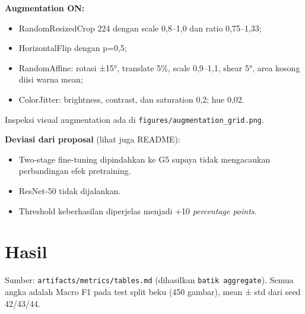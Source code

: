 \documentclass[10pt,a4paper]{article}
\providecommand{\tightlist}{\setlength{\itemsep}{2pt}\setlength{\parskip}{0pt}}
\begin{document}
\textbf{Augmentation ON:}

\begin{itemize}
\tightlist
\item
  RandomResizedCrop 224 dengan scale 0,8--1,0 dan ratio 0,75--1,33;
\item
  HorizontalFlip dengan p=0,5;
\item
  RandomAffine: rotasi ±15°, translate 5\%, scale 0,9--1,1, shear 5°, area kosong
  diisi warna mean;
\item
  ColorJitter: brightness, contrast, dan saturation 0,2; hue 0,02.
\end{itemize}

Inspeksi visual augmentation ada di \texttt{figures/\allowbreak{}augmentation\_\allowbreak{}grid.png}.

\textbf{Deviasi dari proposal} (lihat juga README):

\begin{itemize}
\tightlist
\item
  Two-stage fine-tuning dipindahkan ke G5 supaya tidak mengacaukan perbandingan
  efek pretraining.
\item
  ResNet-50 tidak dijalankan.
\item
  Threshold keberhasilan diperjelas menjadi +10 \emph{percentage points}.
\end{itemize}

\section{Hasil}\label{hasil}

Sumber: \texttt{artifacts/\allowbreak{}metrics/\allowbreak{}tables.md} (dihasilkan \texttt{batik\ aggregate}). Semua angka
adalah Macro F1 pada test split beku (450 gambar), mean ± std dari seed 42/43/44.
\end{document}
